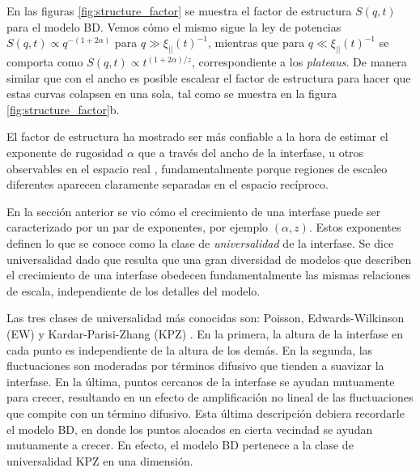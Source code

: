 En las figuras \ref{fig:structure_factor} se muestra el factor de estructura $S(q,t)$ para el modelo BD. Vemos cómo el mismo sigue la ley de potencias 
$S(q,t) \propto q^{-(1+2\alpha)}$ para $q \gg \xi_{||}(t)^{-1}$, mientras que para $q \ll \xi_{||}(t)^{-1}$ se comporta como $S(q,t) \propto t^{(1+2\alpha)/z}$, correspondiente a los \textit{plateaus}. De manera similar que con el ancho es posible escalear el factor de estructura para hacer que estas curvas colapsen en una sola, tal como se muestra en la figura \ref{fig:structure_factor}b. 

El factor de estructura ha mostrado ser más confiable a la hora de estimar el exponente de rugosidad $\alpha$ que a través del ancho de la interfase, u otros observables
en el espacio real \cite{Bustingorry}, fundamentalmente porque regiones de escaleo diferentes aparecen claramente separadas en el espacio recíproco.






En la sección anterior se vio cómo el crecimiento de una interfase puede ser caracterizado por un par de exponentes, por ejemplo $(\alpha,z)$. Estos exponentes 
definen lo que se conoce como la clase de \textit{universalidad} de la interfase. Se dice universalidad dado que resulta que una gran diversidad de modelos que describen el crecimiento de una interfase obedecen fundamentalmente las mismas relaciones de escala, independiente de los detalles del modelo.

Las tres clases de universalidad más conocidas son: Poisson, Edwards-Wilkinson (EW) y Kardar-Parisi-Zhang (KPZ) \cite{Family_1986,PhysRevLett.56.889}. En la primera, 
la altura de la interfase en cada punto es independiente de la altura de los demás. En la segunda, las fluctuaciones son moderadas por términos difusivo que tienden a 
suavizar la interfase. En la última, puntos cercanos de la interfase se ayudan mutuamente para crecer, resultando en un efecto de amplificación no lineal de las fluctuaciones que compite con un término difusivo. Esta última descripción debiera recordarle el modelo BD, en donde los puntos alocados en cierta vecindad se ayudan mutuamente a crecer. En efecto, el modelo BD pertenece a la clase de universalidad KPZ en una dimensión.


